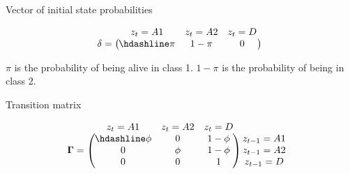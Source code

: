 \documentclass[
  12pt,
]{krantz}
\begin{document}
Vector of initial state probabilities

\[\begin{matrix}
& \\
\mathbf{\delta} =
  \left ( \vphantom{ \begin{matrix} 12 \end{matrix} } \right .
          \end{matrix}
          \hspace{-1.2em}
          \begin{matrix}
          z_t=A1 & z_t=A2 & z_t=D \\ \hdashline
          \pi & 1 - \pi & 0\\
          \end{matrix}
          \hspace{-0.2em}
          \begin{matrix}
          & \\
          \left . \vphantom{ \begin{matrix} 12 \end{matrix} } \right )
\begin{matrix}
\end{matrix}
\end{matrix}\]

\(\pi\) is the probability of being alive in class 1. \(1 - \pi\) is the probability of being in class 2.

Transition matrix

\[\begin{matrix}
& \\
\mathbf{\Gamma} =
  \left ( \vphantom{ \begin{matrix} 12 \\ 12 \\ 12 \end{matrix} } \right .
          \end{matrix}
          \hspace{-1.2em}
          \begin{matrix}
          z_t=A1 & z_t=A2 & z_t=D \\ \hdashline
          \phi  & 0 & 1 - \phi\\
          0 & \phi & 1 - \phi\\
          0 & 0 & 1
          \end{matrix}
          \hspace{-0.2em}
          \begin{matrix}
          & \\
          \left . \vphantom{ \begin{matrix} 12 \\ 12 \\ 12 \end{matrix} } \right )
\begin{matrix}
z_{t-1}=A1 \\ z_{t-1}=A2 \\ z_{t-1}=D
\end{matrix}
\end{matrix}\]
\end{document}
